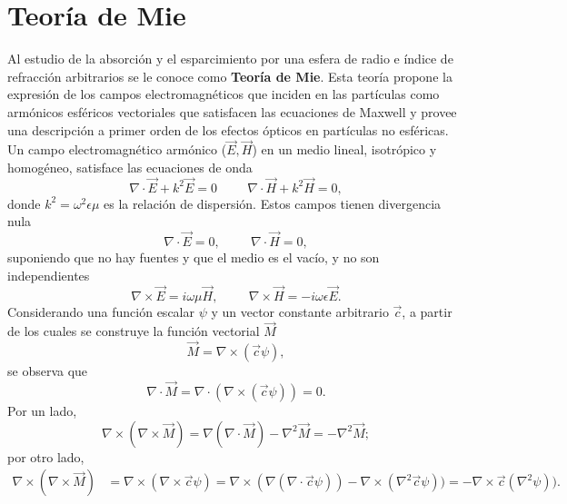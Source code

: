 \section{Teoría de Mie}
Al estudio de la absorción y el esparcimiento por una esfera de radio e índice de refracción arbitrarios se le conoce como \textbf{Teoría de Mie}. Esta teoría propone la expresión de los campos electromagnéticos que inciden en las partículas como armónicos esféricos vectoriales que satisfacen las ecuaciones de Maxwell y provee una descripción a primer orden de los efectos ópticos en partículas no esféricas.\\

Un campo electromagnético armónico ($\Vec{E},\Vec{H}$) en un medio lineal, isotrópico y homogéneo, satisface las ecuaciones de onda \cite{Bohren}
\begin{equation}
	\nabla\cdot\Vec{E}+k^2\Vec{E}=0 \hspace{1cm}\nabla\cdot\Vec{H}+k^2\Vec{H}=0,
\end{equation}
donde $k^2=\omega^2\epsilon\mu$ es la relación de dispersión. Estos campos tienen divergencia nula
\begin{equation}
	\nabla\cdot\Vec{E}=0,\hspace{1cm}\nabla\cdot\Vec{H}=0,
\end{equation}
suponiendo que no hay fuentes y que el medio es el vacío, y no son independientes
\begin{equation}
	\nabla\times\Vec{E}=i\omega\mu\Vec{H},\hspace{1cm}\nabla\times\Vec{H}=-i\omega\epsilon\Vec{E}.
\end{equation}
Considerando una función escalar $\psi$ y un vector constante arbitrario $\Vec{c}$, a partir de los cuales se construye la función vectorial $\Vec{M}$
\begin{equation}
    \Vec{M}=\nabla\times(\Vec{c}\psi),
\end{equation}
se observa que
\begin{equation}
	\nabla\cdot\Vec{M}=\nabla\cdot(\nabla\times(\Vec{c}\psi))=0.
\end{equation}
Por un lado,
\begin{equation*}    
	\nabla\times(\nabla\times \Vec{M})=\nabla(\nabla\cdot \Vec{M})-\nabla^2\Vec{M}=-\nabla^2\Vec{M};
\end{equation*}
por otro lado, 
\begin{align*}
    \nabla\times(\nabla\times \Vec{M})&=\nabla\times(\nabla\times\Vec{c}\psi)= \nabla\times(\nabla(\nabla\cdot \Vec{c}\psi))-\nabla\times(\nabla^2\Vec{c}\psi))= -\nabla\times\Vec{c}(\nabla^2\psi)).
\end{align*}
